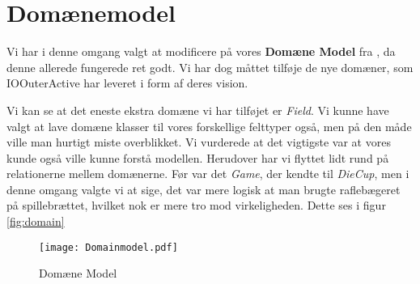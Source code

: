 \section{Domænemodel}
Vi har i denne omgang valgt at modificere på vores \textbf{Domæne Model} fra \cite{19del2}, da denne allerede fungerede ret godt. Vi har dog måttet tilføje de nye domæner, som IOOuterActive har leveret i form af deres vision.


Vi kan se at det eneste ekstra domæne vi har tilføjet er \textit{Field}. Vi kunne have valgt at lave domæne klasser til vores forskellige felttyper også, men på den måde ville man hurtigt miste overblikket. Vi vurderede at det vigtigste var at vores kunde også ville kunne forstå modellen. Herudover har vi flyttet lidt rund på relationerne mellem domænerne. Før var det \textit{Game}, der kendte til \textit{DieCup}, men i denne omgang valgte vi at sige, det var mere logisk at man brugte raflebægeret på spillebrættet, hvilket nok er mere tro mod virkeligheden. Dette ses i figur \vref{fig:domain}

\begin{figure}[!ht]
    \centering
    \texttt{[image: Domainmodel.pdf]}
    \caption[<Text for the list of figures>]{Domæne Model}
    \label{fig:domain}
\end{figure}
\newpage